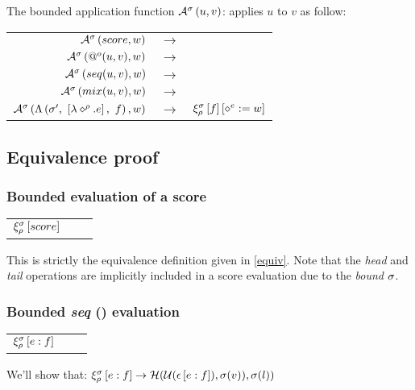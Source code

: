 \documentclass[10pt,a4paper,frenchb]{article}
\makeatletter
\newcommand{\evaltable}[1][$\rightarrow$]	  {\begin{center} \begin{tabular*}{\linewidth}{rc@{ #1 }l}}
\newcommand{\evaltitle}[1]		{\multicolumn{3}{l}{#1} \\ \hline}
\newcommand{\evaltablend}  		{\end{tabular*}\end{center}}
\newcommand{\evalspace}	  		{\vspace{2mm}\\}
\newcommand{\ra}					{\ensuremath{\rightarrow}}
\makeatother
\begin{document}
The bounded application function $\apply{u}{v}$: \edomain{\val}{\val}{\val} applies $u$ to $v$ as follow:
\evaltable[]
 \hline
 $\apply{score}{w}$ 			& \ra & \bapplyScore{score}{w}
 \evalspace
 $\apply{\noredex (u,v)}{w}$ & \ra & \bapplyApply{\noredex (u,v)}{w}
 \evalspace
 $\apply{\apexpr{seq}}{w}$	& \ra & \bapplySeq{u}{v}{w} 
 \evalspace
 $\apply{\apexpr{mix}}{w}$ 	& \ra & \bapplyMix{u}{v}{w} 
 \evalspace
 $\apply{\closure{\envsym}{e}{f}{\bounds'}}{w}$  & \ra & $\evalexpr{f}[\var{e} := w]$ \\
 \hline
\evaltablend


\subsection{Equivalence proof}


\subsubsection{Bounded evaluation of a score}
\evaltable
  $\evalexpr{score}$	& & \bevalScore{score} 
\evaltablend

This is strictly the equivalence definition given in \ref{equiv}. Note that the \emph{head} and \emph{tail} operations are implicitly included in a score evaluation due to the \emph{bound} $\bounds$.

\subsubsection{Bounded \emph{seq} (\seq) evaluation}
\evaltable
 $\evalexpr{\opexpr{\seq}}$	 	&  &  \bevalSeq{e}{f}
\evaltablend

We'll show that: \hspace{1cm} $\evalexpr{\opexpr{\seq}} \ra \equivalence{\evalss{\opexpr{\seq}})}$ \\
\end{document}
